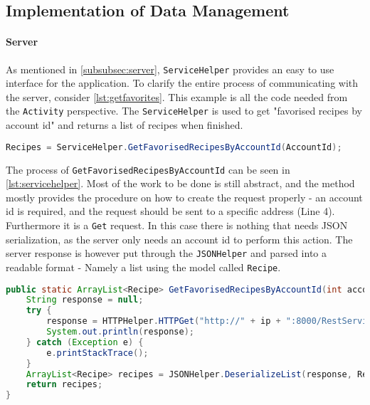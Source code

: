\subsection{Implementation of Data Management}
\label{subsec:datamanagement}


\paragraph{Server}
As mentioned in \ref{subsubsec:server}, \texttt{ServiceHelper} provides an easy to use interface for the application. To clarify the entire process of communicating with the server, consider \ref{lst:getfavorites}. This example is all the code needed from the \texttt{Activity} perspective. The \texttt{ServiceHelper} is used to get "favorised recipes by account id" and returns a list of recipes when finished.

\begin{lstlisting}[language=java, label={lst:getfavorites}, caption={Sending a server request from an Activity}]
Recipes = ServiceHelper.GetFavorisedRecipesByAccountId(AccountId);
\end{lstlisting}

The process of \texttt{GetFavorisedRecipesByAccountId} can be seen in \ref{lst:servicehelper}. Most of the work to be done is still abstract, and the method mostly provides the procedure on how to create the request properly - an account id is required, and the request should be sent to a specific address (Line 4). Furthermore it is a \texttt{Get} request.
In this case there is nothing that needs JSON serialization, as the server only needs an account id to perform this action. The server response is however put through the \texttt{JSONHelper} and parsed into a readable format - Namely a list using the model called \texttt{Recipe}.

\begin{lstlisting}[language=java, label={lst:servicehelper}, caption={GetFavorisedRecipesByAccountId from ServiceHelper}]
public static ArrayList<Recipe> GetFavorisedRecipesByAccountId(int accountId){
    String response = null;
    try {
        response = HTTPHelper.HTTPGet("http://" + ip + ":8000/RestService/Favorises/GetFavorisedRecipesByAccountId?accountId=" + accountId);
        System.out.println(response);
    } catch (Exception e) {
        e.printStackTrace();
    }
    ArrayList<Recipe> recipes = JSONHelper.DeserializeList(response, Recipe.class);
    return recipes;
}
\end{lstlisting}

